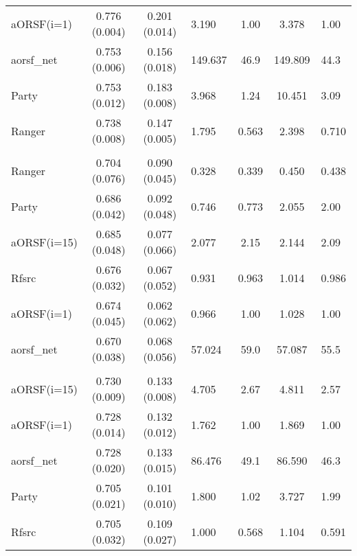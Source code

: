 \documentclass[twoside,11pt]{article}\usepackage[]{graphicx}\usepackage[]{color}
\newenvironment{knitrout}{}{} %
\begin{document}
\begin{knitrout}
\begin{longtable}{lcclccl}
\hspace{1em}aORSF(i=1) & 0.776 (0.004) & 0.201 (0.014) & 3.190 & 1.00 & 3.378 & 1.00\\
\hspace{1em}aorsf\_net & 0.753 (0.006) & 0.156 (0.018) & 149.637 & 46.9 & 149.809 & 44.3\\
\hspace{1em}Party & 0.753 (0.012) & 0.183 (0.008) & 3.968 & 1.24 & 10.451 & 3.09\\
\hspace{1em}Ranger & 0.738 (0.008) & 0.147 (0.005) & 1.795 & 0.563 & 2.398 & 0.710\\
\addlinespace[0.3em]
\hline
\multicolumn{7}{l}{\textit{\textbf{gbsg2}}}\\
\hline
\hspace{1em}Ranger & 0.704 (0.076) & 0.090 (0.045) & 0.328 & 0.339 & 0.450 & 0.438\\
\hspace{1em}Party & 0.686 (0.042) & 0.092 (0.048) & 0.746 & 0.773 & 2.055 & 2.00\\
\hspace{1em}aORSF(i=15) & 0.685 (0.048) & 0.077 (0.066) & 2.077 & 2.15 & 2.144 & 2.09\\
\hspace{1em}Rfsrc & 0.676 (0.032) & 0.067 (0.052) & 0.931 & 0.963 & 1.014 & 0.986\\
\hspace{1em}aORSF(i=1) & 0.674 (0.045) & 0.062 (0.062) & 0.966 & 1.00 & 1.028 & 1.00\\
\hspace{1em}aorsf\_net & 0.670 (0.038) & 0.068 (0.056) & 57.024 & 59.0 & 57.087 & 55.5\\
\addlinespace[0.3em]
\hline
\multicolumn{7}{l}{\textit{\textbf{guide\_it}}}\\
\hline
\hspace{1em}aORSF(i=15) & 0.730 (0.009) & 0.133 (0.008) & 4.705 & 2.67 & 4.811 & 2.57\\
\hspace{1em}aORSF(i=1) & 0.728 (0.014) & 0.132 (0.012) & 1.762 & 1.00 & 1.869 & 1.00\\
\hspace{1em}aorsf\_net & 0.728 (0.020) & 0.133 (0.015) & 86.476 & 49.1 & 86.590 & 46.3\\
\hspace{1em}Party & 0.705 (0.021) & 0.101 (0.010) & 1.800 & 1.02 & 3.727 & 1.99\\
\hspace{1em}Rfsrc & 0.705 (0.032) & 0.109 (0.027) & 1.000 & 0.568 & 1.104 & 0.591\\

\end{longtable}
\end{knitrout}
\end{document}
